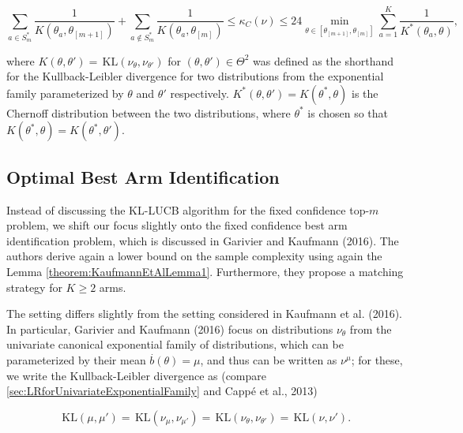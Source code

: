 \documentclass[11pt,]{article}
\newcommand{\KL}{\,\text{KL}}
\begin{document}
\begin{equation*}
\sum_{a \in S^*_m} \frac{1}{K(\theta_a, \theta_{[m+1]})} + \sum_{a \notin S^*_m} \frac{1}{K(\theta_a,\theta_{[m]})} \leq \kappa_C(\nu) \leq 24 \min_{\theta \in [\theta_{[m+1]},\theta_{[m]}]} \sum_{a=1}^{K} \frac{1}{K^*(\theta_a, \theta)},
\end{equation*}

where \(K(\theta, \theta') = \KL(\nu_{\theta}, \nu_{\theta'})\) for
\((\theta, \theta') \in \Theta^2\) was defined as the shorthand for the
Kullback-Leibler divergence for two distributions from the exponential
family parameterized by \(\theta\) and \(\theta'\) respectively.
\(K^*(\theta,\theta') = K(\theta^*, \theta)\) is the Chernoff
distribution between the two distributions, where \(\theta^*\) is chosen
so that \(K(\theta^*,\theta) = K(\theta^*, \theta')\).

\subsection{\texorpdfstring{Optimal Best Arm Identification
\label{sec:OptimalBestArmIdentification}}{Optimal Best Arm Identification }}\label{optimal-best-arm-identification}

Instead of discussing the KL-LUCB algorithm for the fixed confidence
top-\(m\) problem, we shift our focus slightly onto the fixed confidence
best arm identification problem, which is discussed in Garivier and
Kaufmann (2016). The authors derive again a lower bound on the sample
complexity using again the Lemma \autoref{theorem:KaufmannEtAlLemma1}.
Furthermore, they propose a matching strategy for \(K \geq 2\) arms.

The setting differs slightly from the setting considered in Kaufmann et
al. (2016). In particular, Garivier and Kaufmann (2016) focus on
distributions \(\nu_{\theta}\) from the univariate canonical exponential
family of distributions, which can be parameterized by their mean
\(\stackrel{.}{b}(\theta) = \mu\), and thus can be written as
\(\nu^{\mu}\); for these, we write the Kullback-Leibler divergence as
(compare \autoref{sec:LRforUnivariateExponentialFamily} and Cappé et
al., 2013)

\begin{equation*}
\KL(\mu, \mu') = \KL(\nu_{\mu},\nu_{\mu'}) = \KL(\nu_{\theta},\nu_{\theta'}) = \KL(\nu, \nu').
\end{equation*}
\end{document}
